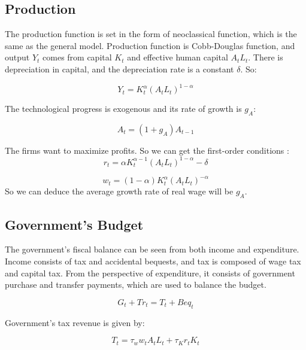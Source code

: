 \documentclass{article}
\begin{document}
    \subsection{Production}
        The production function is set in the form of neoclassical function, which is the same as the general model. 
        Production function is Cobb-Douglas function, and output $Y_t$ comes from capital $K_t$ and effective human capital $A_tL_t$. 
        There is depreciation in capital, and the depreciation rate is a constant $\delta$.
        So:

        \begin{equation}
            Y_t=K_t^\alpha(A_tL_t)^{1-\alpha}
        \end{equation}

        The technological progress is exogenous and its rate of growth is $g_A$:

        \begin{equation}
            A_t=(1+g_A)A_{t-1}
        \end{equation}

        The firms want to maximize profits. So we can get the first-order conditions :
        \begin{equation}
            r_t=\alpha K_t^{\alpha-1}(A_tL_t)^{1-\alpha}-\delta
        \end{equation}

        \begin{equation}
            w_t=(1-\alpha)K_t^\alpha(A_tL_t)^{-\alpha}
        \end{equation}
        So we can deduce the average growth rate of real wage will be $g_A$.
    \subsection{Government's Budget}
        The government's fiscal balance can be seen from both income and expenditure. 
        Income consists of tax and accidental bequests, and tax is composed of wage tax and capital tax.
        From the perspective of expenditure, it consists of government purchase and transfer payments, 
        which are used to balance the budget.

        \begin{equation}
            G_t+Tr_t=T_t+Beq_t
        \end{equation}

        Government's tax revenue is given by:

        \begin{equation}
            T_t=\tau_ww_tA_tL_t+\tau_Kr_tK_t
        \end{equation}
\end{document}
